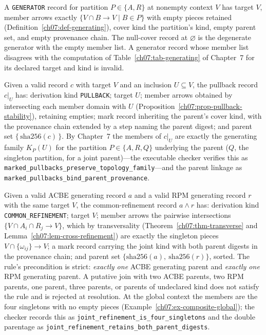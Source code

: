 \begin{ruleenv}\label{ch08:rule-generator}
A \texttt{GENERATOR} record for partition $P\in\{A,R\}$ at nonempty context $V$ has target $V$, member arrows exactly $\{V\cap B\to V \mid B\in P\}$ with empty pieces retained (Definition~\ref{ch07:def-generating}), cover kind the partition's kind, empty parent set, and empty provenance chain. The null-cover record at $\varnothing$ is the degenerate generator with the empty member list. A generator record whose member list disagrees with the computation of Table~\ref{ch07:tab-generating} of Chapter~7 for its declared target and kind is invalid.
\end{ruleenv}

\begin{ruleenv}\label{ch08:rule-pullback}
Given a valid record $c$ with target $V$ and an inclusion $U\subseteq V$, the pullback record $c|_{U}$ has: derivation kind \texttt{PULLBACK}; target $U$; member arrows obtained by intersecting each member domain with $U$ (Proposition~\ref{ch07:prop-pullback-stability}), retaining empties; mark record inheriting the parent's cover kind, with the provenance chain extended by a step naming the parent digest; and parent set $\{\,\mathrm{sha256}(c)\,\}$. By Chapter~7 the members of $c|_{U}$ are exactly the generating family $K_{P}(U)$ for the partition $P\in\{A,R,Q\}$ underlying the parent ($Q$, the singleton partition, for a joint parent)---the executable checker verifies this as \texttt{marked\_pullbacks\_preserve\_topology\_family}---and the parent linkage as \texttt{marked\_pullbacks\_bind\_parent\_provenance}.
\end{ruleenv}

\begin{ruleenv}\label{ch08:rule-refinement}
Given a valid ACBE generating record $a$ and a valid RPM generating record $r$ with the same target $V$, the common-refinement record $a\wedge r$ has: derivation kind \texttt{COMMON\_REFINEMENT}; target $V$; member arrows the pairwise intersections $\{V\cap A_{i}\cap R_{j}\to V\}$, which by transversality (Theorem~\ref{ch07:thm-transverse} and Lemma~\ref{ch07:lem-cross-refinement}) are exactly the singleton pieces $V\cap\{\omega_{ij}\}\to V$; a mark record carrying the joint kind with both parent digests in the provenance chain; and parent set $\{\mathrm{sha256}(a),\ \mathrm{sha256}(r)\}$, sorted. The rule's precondition is strict: \emph{exactly one} ACBE generating parent and \emph{exactly one} RPM generating parent. A putative join with two ACBE parents, two RPM parents, one parent, three parents, or parents of unde\-clared kind does not satisfy the rule and is rejected at resolution. At the global context the members are the four singletons with no empty pieces (Example~\ref{ch07:ex-composite-global}); the checker records this as \texttt{joint\_refinement\_is\_four\_singletons} and the double parentage as \texttt{joint\_refinement\_retains\_both\_parent\_digests}.
\end{ruleenv}

